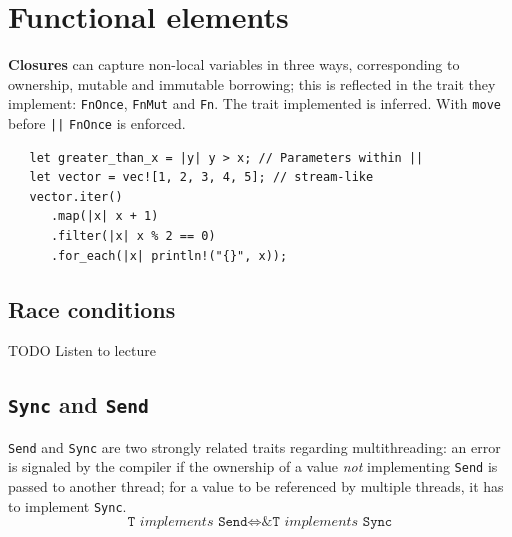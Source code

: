 \section{Functional elements}

\textbf{Closures} can capture non-local variables in three ways,
corresponding to ownership, mutable and immutable
borrowing; 
this is reflected in the trait they implement: \lstinline|FnOnce|,
\lstinline|FnMut| and \lstinline|Fn|.
The trait implemented is inferred.
With \lstinline|move| before \lstinline{||} \lstinline|FnOnce| is enforced.
\begin{lstlisting}
   let greater_than_x = |y| y > x; // Parameters within ||
   let vector = vec![1, 2, 3, 4, 5]; // stream-like
   vector.iter()
      .map(|x| x + 1)
      .filter(|x| x % 2 == 0)
      .for_each(|x| println!("{}", x));
\end{lstlisting}

\subsection{Race conditions}
TODO Listen to lecture
\nl

\subsection{\texttt{Sync} and \texttt{Send}}
\lstinline|Send| and \lstinline|Sync| are two strongly related traits regarding multithreading: 
an error is signaled by the compiler if the ownership of
a value \textit{not} implementing \lstinline|Send| is passed to another thread;
for a value to be referenced by multiple threads, it has to
implement \lstinline|Sync|.
\begin{equation}
   \texttt{T} \textit{ implements } \texttt{Send} \Leftrightarrow \texttt{\&T} \textit{ implements } \texttt{Sync}
\end{equation}
